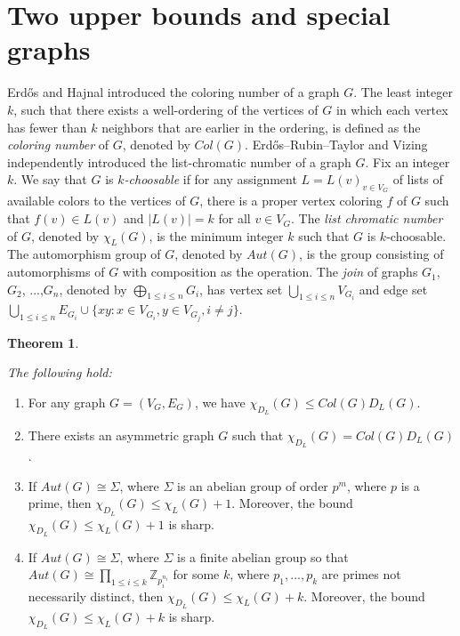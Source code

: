 \documentclass[12pt,reqno,a4paper]{amsart}
\theoremstyle{definition}
\newtheorem{thm}[defn]{Theorem}
\begin{document}
\section{Two upper bounds and special graphs}

Erd\H{o}s and Hajnal \cite{EH1966} introduced 
the coloring number of a graph $G$. The least integer $k$, such that there exists a well-ordering of the vertices of $G$ in which each vertex has fewer than $k$ neighbors that are earlier in the ordering, is defined as the {\em coloring number} of $G$, denoted by $Col(G)$.  
Erd\H{o}s–Rubin–Taylor \cite{ERT1979} and Vizing \cite{Viz1976} independently introduced the list-chromatic number of a graph $G$. Fix an integer $k$. We say that $G$ is {\em $k$-choosable} if for any assignment $L = {L(v)}_{v\in V_{G}}$ of lists of available colors to the vertices of $G$, there is a proper vertex coloring $f$ of $G$ such that $f(v) \in L(v)$ and $\vert L(v)\vert=k$ for all $v\in V_{G}$. The {\em list chromatic number}
of $G$, denoted by $\chi_{L}(G)$, is the minimum integer $k$ such that $G$ is $k$-choosable. The automorphism group of $G$, denoted by $Aut(G)$, is the group consisting of automorphisms of $G$ with composition as the operation. The {\em join} of graphs $G_{1}$, $G_{2}$, ...,$G_{n}$, denoted by $\bigoplus_{1\leq i\leq n} G_{i}$, has
vertex set $\bigcup_{1\leq i\leq n}V_{G_{i}}$ and edge set 
$\bigcup_{1\leq i\leq n}E_{G_{i}}\cup \{xy: x \in V_{G_{i}}, y \in V_{G_{j}}, i \neq j\}$.


\begin{thm}\label{Theorem 5.1}
{\em The following hold:
\begin{enumerate}
    \item For any graph $G=(V_{G},E_{G})$, we have $\chi_{D_{L}}(G)\leq Col(G)D_{L}(G)$.
    \item There exists an asymmetric graph $G$ such that $\chi_{D_{L}}(G)= Col(G)D_{L}(G)$.
    \item If $Aut(G)\cong \Sigma$, where $\Sigma$ is an abelian group of order $p^{m}$, 
    where $p$ is a prime,
    then $\chi_{D_{L}}(G)\leq \chi_{L}(G)+1$. Moreover, the bound $\chi_{D_{L}}(G)\leq \chi_{L}(G)+1$ is sharp. 
    \item If $Aut(G)\cong \Sigma$, where $\Sigma$ is a finite abelian group so that $Aut(G)\cong \prod_{1\leq i\leq k} \mathbb{Z}_{p_{i}^{n_{i}}}$ for some $k$, where $p_{1},...,p_{k}$ are primes not necessarily distinct, then $\chi_{D_{L}}(G)\leq \chi_{L}(G)+k$.
     Moreover, the bound $\chi_{D_{L}}(G)\leq \chi_{L}(G)+k$ is sharp.
\end{enumerate}
}   
\end{thm}
\end{document}

